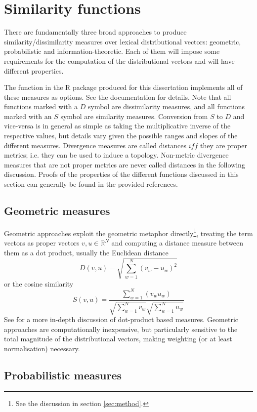 \chapter{Similarity functions}
\label{app:simdiv}

There are fundamentally three broad approaches to produce similarity/dissimilarity measures over lexical distributional vectors: geometric, probabilistic and information-theoretic.
Each of them will impose some requirements for the computation of the distributional vectors and will have different properties.

The  function in the  R package produced for this dissertation implements all of these measures as options. See the  documentation for details.
Note that all functions marked with a $D$ symbol are dissimilarity measures, and all functions marked with an $S$ symbol are similarity measures.
Conversion from $S$ to $D$ and vice-versa is in general as simple as taking the multiplicative inverse of the respective values, but details vary given the possible ranges and slopes of the different measures.
Divergence measures are called distances $iff$ they are proper metrics; i.e. they can be used to induce a topology.
Non-metric divergence measures that are not proper metrics are never called distances in the following discussion.
Proofs of the properties of the different functions discussed in this section can generally be found in the provided references.

\section{Geometric measures}

Geometric approaches exploit the geometric metaphor directly\footnote{
    See the discussion in section \ref{sec:method}.
}, treating the term vectors as proper vectors $v, u \in \mathbb{R}^N$ and computing a distance measure between them as a dot product, usually the Euclidean distance
    $$D(v,u) = \sqrt{ \sum_{w=1}^N( v_w - u_w )^2 }$$
or the cosine similarity
    $$S(v,u) = \frac{ \sum_{w=1}^N( v_w u_w ) }{ \sqrt{ \sum_{w=1}^N v_w } \sqrt{ \sum_{w=1}^N u_w } }$$
See \citet[chap. 6, pp 110ff]{salton1988,manning2008} for a more in-depth discussion of dot-product based measures.
Geometric approaches are computationally inexpensive, but particularly sensitive to the total magnitude of the distributional vectors, making weighting (or at least normalisation) necessary.

\section{Probabilistic measures}

